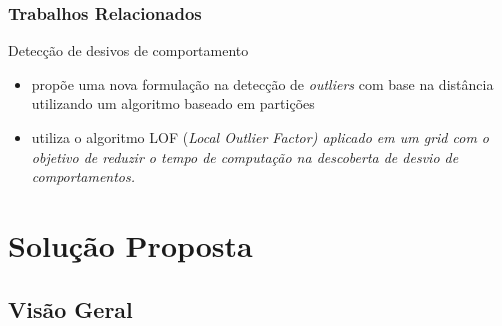 \documentclass[hyperref={pdfpagelabels=false}]{beamer}
\begin{document}

%    

\begin{frame}

        \frametitle{Trabalhos Relacionados}
        
       Detecção de desivos de comportamento \begin{itemize}
               \item \cite{022-000} propõe uma nova formulação na detecção de \textit{outliers} com base na distância utilizando um algoritmo baseado em partições
               \item \cite{023-000} utiliza o algoritmo LOF (\it{Local Outlier Factor}) aplicado em um grid com o objetivo de reduzir o tempo de computação na descoberta de desvio de comportamentos.
       \end {itemize}
\end{frame}

\section{Solução Proposta}

\subsection{Visão Geral}  
\end{document}
